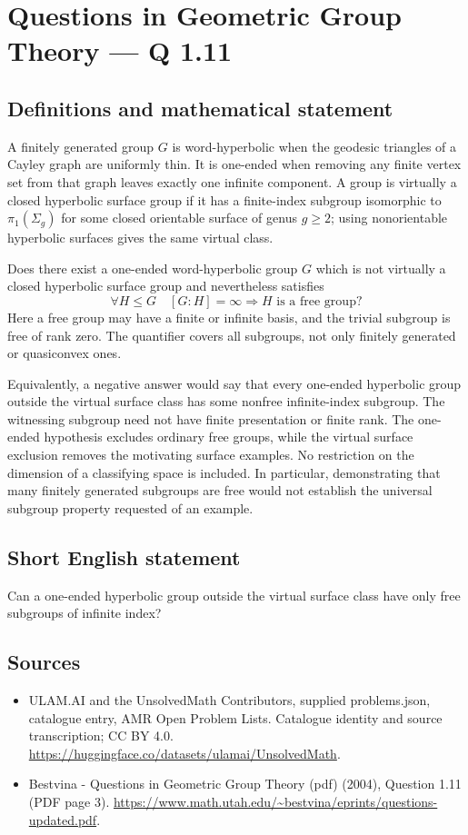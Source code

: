 \documentclass[11pt,a4paper]{article}
\begin{document}
\section*{Questions in Geometric Group Theory — Q 1.11}\label{statement}

\subsection{Definitions and mathematical statement}
A finitely generated group $G$ is word-hyperbolic when the geodesic triangles of a Cayley graph are uniformly thin. It is one-ended when removing any finite vertex set from that graph leaves exactly one infinite component. A group is virtually a closed hyperbolic surface group if it has a finite-index subgroup isomorphic to $\pi_1(\Sigma_g)$ for some closed orientable surface of genus $g\geq2$; using nonorientable hyperbolic surfaces gives the same virtual class.

Does there exist a one-ended word-hyperbolic group $G$ which is not virtually a closed hyperbolic surface group and nevertheless satisfies
\[
 \forall H\leq G\quad [G:H]=\infty
       \Longrightarrow H\text{ is a free group}?
\]
Here a free group may have a finite or infinite basis, and the trivial subgroup is free of rank zero. The quantifier covers all subgroups, not only finitely generated or quasiconvex ones.

Equivalently, a negative answer would say that every one-ended hyperbolic group outside the virtual surface class has some nonfree infinite-index subgroup. The witnessing subgroup need not have finite presentation or finite rank. The one-ended hypothesis excludes ordinary free groups, while the virtual surface exclusion removes the motivating surface examples. No restriction on the dimension of a classifying space is included. In particular, demonstrating that many finitely generated subgroups are free would not establish the universal subgroup property requested of an example.
\subsection{Short English statement}
Can a one-ended hyperbolic group outside the virtual surface class have only free subgroups of infinite index?
\subsection{Sources}
\begin{itemize}
\item[S1] ULAM.AI and the UnsolvedMath Contributors, supplied problems.json, catalogue entry, AMR Open Problem Lists. Catalogue identity and source transcription; CC BY 4.0.
\url{https://huggingface.co/datasets/ulamai/UnsolvedMath}.
\item[S2] Bestvina - Questions in Geometric Group Theory (pdf) (2004), Question 1.11 (PDF page 3). 
\url{https://www.math.utah.edu/~bestvina/eprints/questions-updated.pdf}.
\end{itemize}
\end{document}
